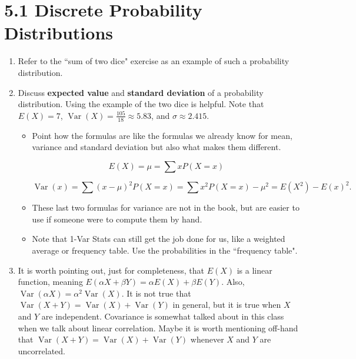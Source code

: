 \documentclass{article}
\DeclareMathOperator{\Var}{Var}
\begin{document}
\section*{5.1 Discrete Probability Distributions}

\begin{enumerate}

  \item Refer to the ``sum of two dice" exercise as an example of such a probability distribution.
  
  \item Discuss {\bf expected value} and {\bf standard deviation} of a probability distribution. Using the example of the two dice is helpful. Note that $E(X) = 7$, $\Var(X) = \frac{105}{18} \approx 5.83$, and $\sigma \approx 2.415$. 
  
    \begin{itemize}
    
      \item Point how the formulas are like the formulas we already know for mean, variance and standard deviation but also what makes them different.
      
      $$E(X) = \mu = \sum xP(X=x)$$
      
      $$\Var(x) = \sum (x-\mu)^2 P(X=x) = \sum x^2P(X=x) - \mu^2 = E(X^2) - E(x)^2.$$
      
      \item These last two formulas for variance are not in the book, but are easier to use if someone were to compute them by hand.
      
      \item Note that 1-Var Stats can still get the job done for us, like a weighted average or frequency table. Use the probabilities in the ``frequency table".
      
    \end{itemize}
    
  \item It is worth pointing out, just for completeness, that $E(X)$ is a linear function, meaning $E(\alpha X + \beta Y) = \alpha E(X) + \beta E(Y)$. Also, $\Var(\alpha X) = \alpha^2 \Var(X)$. It is not true that $\Var(X + Y) = \Var(X) + \Var(Y)$ in general, but it is true when $X$ and $Y$ are independent. Covariance is somewhat talked about in this class when we talk about linear correlation. Maybe it is worth mentioning off-hand that $\Var(X + Y) = \Var(X) + \Var(Y)$ whenever $X$ and $Y$ are uncorrelated.

\end{enumerate}
\end{document}
